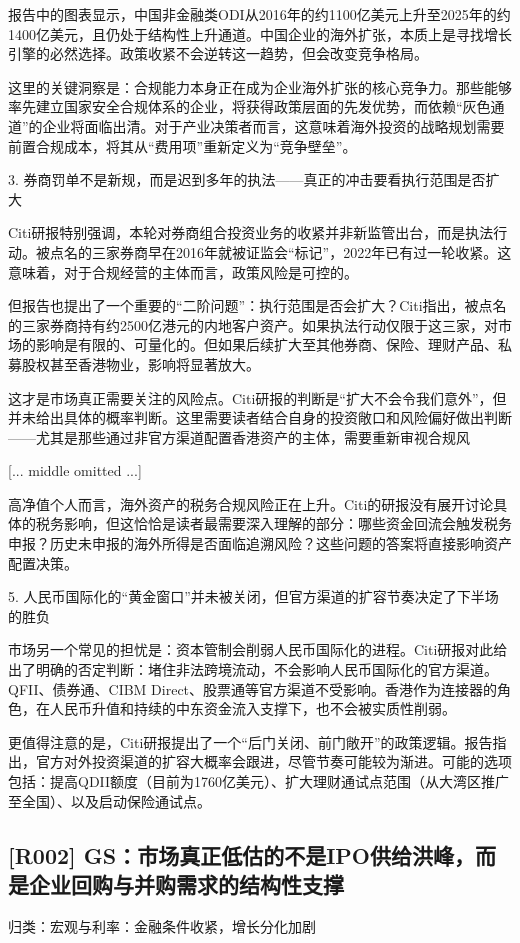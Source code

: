 \documentclass[11pt]{ctexart}
\begin{document}
报告中的图表显示，中国非金融类ODI从2016年的约1100亿美元上升至2025年的约1400亿美元，且仍处于结构性上升通道。中国企业的海外扩张，本质上是寻找增长引擎的必然选择。政策收紧不会逆转这一趋势，但会改变竞争格局。

这里的关键洞察是：合规能力本身正在成为企业海外扩张的核心竞争力。那些能够率先建立国家安全合规体系的企业，将获得政策层面的先发优势，而依赖“灰色通道”的企业将面临出清。对于产业决策者而言，这意味着海外投资的战略规划需要前置合规成本，将其从“费用项”重新定义为“竞争壁垒”。

3. 券商罚单不是新规，而是迟到多年的执法——真正的冲击要看执行范围是否扩大

Citi研报特别强调，本轮对券商组合投资业务的收紧并非新监管出台，而是执法行动。被点名的三家券商早在2016年就被证监会“标记”，2022年已有过一轮收紧。这意味着，对于合规经营的主体而言，政策风险是可控的。

但报告也提出了一个重要的“二阶问题”：执行范围是否会扩大？Citi指出，被点名的三家券商持有约2500亿港元的内地客户资产。如果执法行动仅限于这三家，对市场的影响是有限的、可量化的。但如果后续扩大至其他券商、保险、理财产品、私募股权甚至香港物业，影响将显著放大。

这才是市场真正需要关注的风险点。Citi研报的判断是“扩大不会令我们意外”，但并未给出具体的概率判断。这里需要读者结合自身的投资敞口和风险偏好做出判断——尤其是那些通过非官方渠道配置香港资产的主体，需要重新审视合规风

[... middle omitted ...]

高净值个人而言，海外资产的税务合规风险正在上升。Citi的研报没有展开讨论具体的税务影响，但这恰恰是读者最需要深入理解的部分：哪些资金回流会触发税务申报？历史未申报的海外所得是否面临追溯风险？这些问题的答案将直接影响资产配置决策。

5. 人民币国际化的“黄金窗口”并未被关闭，但官方渠道的扩容节奏决定了下半场的胜负

市场另一个常见的担忧是：资本管制会削弱人民币国际化的进程。Citi研报对此给出了明确的否定判断：堵住非法跨境流动，不会影响人民币国际化的官方渠道。QFII、债券通、CIBM Direct、股票通等官方渠道不受影响。香港作为连接器的角色，在人民币升值和持续的中东资金流入支撑下，也不会被实质性削弱。

更值得注意的是，Citi研报提出了一个“后门关闭、前门敞开”的政策逻辑。报告指出，官方对外投资渠道的扩容大概率会跟进，尽管节奏可能较为渐进。可能的选项包括：提高QDII额度（目前为1760亿美元）、扩大理财通试点范围（从大湾区推广至全国）、以及启动保险通试点。

\subsection{[R002] GS：市场真正低估的不是IPO供给洪峰，而是企业回购与并购需求的结构性支撑}
{\small\color{refgray}归类：宏观与利率：金融条件收紧，增长分化加剧}
\end{document}
